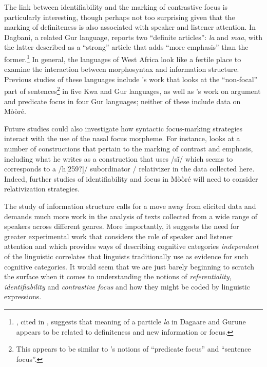 \documentclass[output=paper]{langsci/langscibook}
\begin{document}
The link between identifiability and the marking of contrastive focus is particularly interesting, though perhaps not too surprising given that the marking of definiteness is also associated with speaker and listener attention. In Dagbani, a related Gur language, \citet[40]{Olawsky1999} reports two “definite articles”: \textit{la }and \textit{maa}, with the latter described as a “strong” article that adds “more emphasis” than the former.\footnote{\cite{Kropp-Dakubu1991}, cited in \citet[30]{Olawsky1999}, suggests that meaning of a particle \textit{la} in Dagaare and Gurune appears to be related to definiteness and new information or focus.} In general, the languages of West Africa look like a fertile place to examine the interaction between morphosyntax and information structure. Previous studies of these languages include \cite{Fiedler&Schwarz2005}'s work that looks at the “non-focal” part of sentences\footnote{This appears to be similar to \cite{Lambrecht1994}'s notions of “predicate focus” and “sentence focus”.} in five Kwa and Gur languages, as well as \cite{Schwarz2010}'s work on argument and predicate focus in four Gur languages; neither of these include data on M\`{o}\`{o}r\'{e}.

Future studies could also investigate how syntactic focus-marking strategies interact with the use of the nasal focus morpheme. For instance, \citet[445-450]{Kabore1985} looks at a number of constructions that pertain to the marking of contrast and emphasis, including what he writes as a construction that uses /s\~{i}/ which seems to corresponds to a /h[259?]/ subordinator / relativizer in the data collected here. Indeed, further studies of identifiability and focus in M\`{o}\`{o}r\'{e} will need to consider relativization strategies.

The study of information structure calls for a move away from elicited data and demands much more work in the analysis of texts collected from a wide range of speakers across different genres. More importantly, it suggests the need for greater experimental work that considers the role of speaker and listener attention and which provides ways of describing cognitive categories \textit{independent} of the linguistic correlates that linguists traditionally use as evidence for such cognitive categories. It would seem that we are just barely beginning to scratch the surface when it comes to understanding the notions of \textit{referentiality}, \textit{identifiability} and \textit{contrastive focus} and how they might be coded by linguistic expressions.
\end{document}
